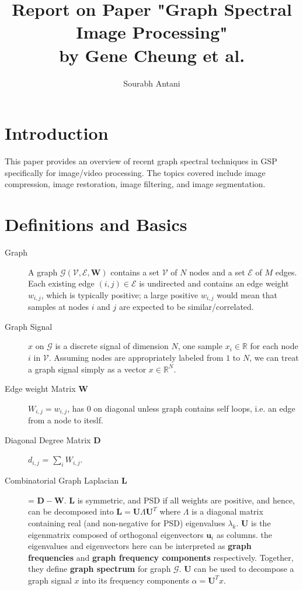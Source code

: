 \documentclass[10pt,a4paper, nocenter]{report}
\author{Sourabh Antani}
\title{Report on Paper "Graph Spectral Image Processing" \\by Gene Cheung et al.}
\date{}
\begin{document}
	\maketitle
	\chapter*{Introduction}
	\thispagestyle{fancy}
	This paper provides an overview of recent graph spectral techniques in GSP specifically for image/video processing. The topics covered include image compression, image restoration, image filtering, and image segmentation.
	
	\chapter*{Definitions and Basics}
	\thispagestyle{fancy}
	\begin{description}
	\item[Graph] A graph $\mathcal{G}(\mathcal{V},\mathcal{E},\mathbf{W})$ contains a set $\mathcal{V}$ of $N$ nodes and a set $\mathcal{E}$ of $M$ edges. Each existing edge $(i,j) \in \mathcal{E}$ is undirected and contains an edge weight $w_{i,j}$, which is typically positive; a large positive $w_{i,j}$ would mean that samples at nodes $i$ and $j$ are expected to be similar/correlated.
	
	\item[Graph Signal] $x$ on $\mathcal{G}$ is a discrete signal of dimension $N$, one sample $x_{i}\in \mathbb{R}$ for each node $i$ in $\mathcal{V}$. Assuming nodes are appropriately labeled from $1$ to $N$, we can treat a graph signal simply as a vector $x \in \mathbb{R}^{N}$.
	
	\item[Edge weight Matrix $\mathbf{W}$] $W_{i,j}=w_{i,j}$, has $0$ on diagonal unless graph contains self loops, i.e. an edge from a node to iteslf.
	
	\item[Diagonal Degree Matrix $\mathbf{D}$] $d_{i,j}$ = $\sum_{i}W_{i,j}$.
	
	\item[Combinatorial Graph Laplacian $\mathbf{L}$] = $\mathbf{D}-\mathbf{W}$. $\mathbf{L}$ is symmetric, and PSD if all weights are positive, and hence, can be decomposed into $\mathbf{L}=\mathbf{U}\Lambda\mathbf{U}^{T}$ where $\Lambda$ is a diagonal matrix containing real (and non-negative for PSD) eigenvalues $\lambda_{k}$. $\mathbf{U}$ is the eigenmatrix composed of orthogonal eigenvectors $\mathbf{u}_{i}$ as columns. the eigenvalues and eigenvectors here can be interpreted as \textbf{graph frequencies} and \textbf{graph frequency components} respectively. Together, they define \textbf{graph spectrum} for graph $\mathcal{G}$. $\mathbf{U}$ can be used to decompose a graph signal $x$ into its frequency components $\alpha = \mathbf{U}^{T}x$.
	

\end{description}
\end{document}
